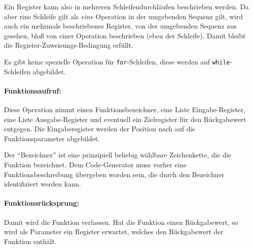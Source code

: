 \documentclass[twoside,a4paper,fleqn,12pt]{article}
\begin{document}

Ein Register kann also in mehreren Schleifendurchläufen beschrieben werden.
Da aber rine Schleife gilt als \emph{eine} Operation in der umgebenden Sequenz gilt, wird auch ein mehrmals beschriebenes Register,
von der umgebenden Sequenz aus gesehen, bloß von einer Operation beschrieben (eben der Schleife).
Damit bleibt die Register-Zuweisungs-Bedingung erfüllt.

Es gibt keine spezielle Operation für \texttt{for}-Schleifen, diese werden auf \texttt{while}-Schleifen abgebildet.

\paragraph{Funktionsaufruf:} Diese Operation nimmt einen Funktionsbezeichner, eine Liste Eingabe-Register, eine Liste Ausgabe-Register
und eventuell ein Zielregister für den Rückgabewert entgegen. Die Eingaberegister werden der Position nach auf die Funktionsparameter abgebildet.

Der "`Bezeichner"' ist eine prinzipiell beliebig wählbare Zeichenkette, die die Funktion bezeichnet. Dem Code-Generator muss
vorher eine Funktionsbeschreibung übergeben worden sein, die durch den Bezeichner identifiziert werden kann.

\paragraph{Funktionsrücksprung:} Damit wird die Funktion verlassen. Hat die Funktion einen Rückgabewert, so wird als Parameter ein Register
erwartet, welches den Rückgabewert der Funktion enthält.
\end{document}
